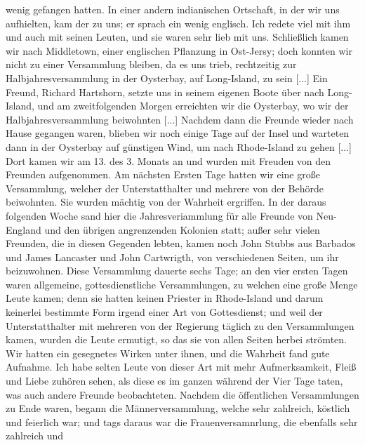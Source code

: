 wenig gefangen hatten. In einer andern indianischen Ortschaft, in
der wir uns aufhielten, kam der  zu uns; er sprach ein
wenig englisch. Ich redete viel mit ihm und auch mit seinen
Leuten, und sie waren sehr lieb mit uns. Schließlich kamen
wir nach Middletown, einer englischen Pflanzung 
in Ost-Jersy;
doch konnten wir nicht zu einer Versammlung bleiben, da es uns
trieb, rechtzeitig zur Halbjahresversammlung in der Oysterbay,
auf Long-Island, zu sein [...] Ein Freund, 
Richard Hartshorn,
setzte uns in seinem eigenen Boote über nach Long-Island, und
am zweitfolgenden Morgen erreichten wir die Oysterbay, wo wir der
Halbjahresversammlung beiwohnten [...] Nachdem dann die
Freunde wieder nach Hause gegangen waren, blieben wir noch
einige Tage auf der Insel und warteten dann in der Oysterbay
auf günstigen Wind, um nach Rhode-Island zu gehen [...]
Dort kamen wir am 13. des 3. Monats an und wurden mit
Freuden von den Freunden aufgenommen. Am nächsten
Ersten Tage hatten wir eine große Versammlung, welcher der
Unterstatthalter und mehrere von der Behörde beiwohnten. Sie
wurden mächtig von der Wahrheit ergriffen. In der daraus
folgenden Woche sand hier die Jahresveriammlung für alle Freunde
von Neu-England und den übrigen angrenzenden Kolonien statt;
außer sehr vielen Freunden, die in diesen Gegenden lebten, kamen
noch John Stubbs aus Barbados 
und James Lancaster und
John Cartwrigth, von 
verschiedenen Seiten, um ihr beizuwohnen.
Diese Versammlung dauerte sechs Tage; an den vier ersten Tagen
waren allgemeine, gottesdienstliche Versammlungen, zu welchen
eine große Menge Leute kamen; denn sie hatten keinen Priester
in Rhode-Island und darum keinerlei bestimmte Form irgend
einer Art von Gottesdienst; und weil der Unterstatthalter mit
mehreren von der Regierung täglich 
zu den Versammlungen kamen, wurden die Leute ermutigt, so 
das sie von allen Seiten herbei strömten. Wir hatten ein 
gesegnetes Wirken unter ihnen, und
die Wahrheit fand gute Aufnahme. Ich habe selten Leute von
dieser Art mit mehr Aufmerksamkeit, Fleiß und Liebe zuhören
sehen, als diese es im ganzen während der Vier Tage taten, was
auch andere Freunde beobachteten. Nachdem die öffentlichen
Versammlungen zu Ende waren, begann die Männerversammlung,
welche sehr zahlreich, köstlich und feierlich war; und tags daraus
war die Frauenversamnrlung, die ebenfalls sehr zahlreich und
